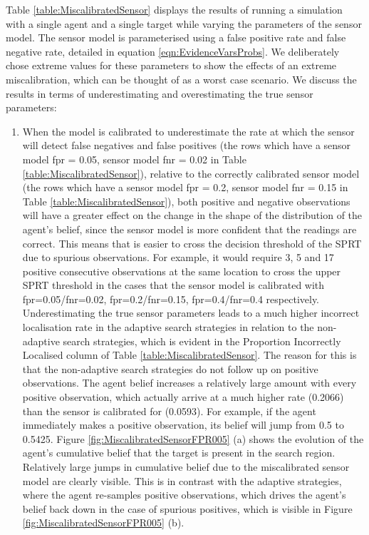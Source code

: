 Table \ref{table:MiscalibratedSensor} displays the results of running a simulation with a single agent and a single target while varying the parameters of the sensor model. The sensor model is parameterised using a false positive rate and false negative rate, detailed in equation \ref{eqn:EvidenceVarsProbs}. We deliberately chose extreme values for these parameters to show the effects of an extreme miscalibration, which can be thought of as a worst case scenario. We discuss the results in terms of underestimating and overestimating the true sensor parameters:
\begin{enumerate}
    \item When the model is calibrated to underestimate the rate at which the sensor will detect false negatives and false positives (the rows which have a sensor model fpr = 0.05, sensor model fnr = 0.02 in Table \ref{table:MiscalibratedSensor}), relative to the correctly calibrated sensor model (the rows which have a sensor model fpr = 0.2, sensor model fnr = 0.15 in Table \ref{table:MiscalibratedSensor}), both positive and negative observations will have a greater effect on the change in the shape of the distribution of the agent's belief, since the sensor model is more confident that the readings are correct. This means that is easier to cross the decision threshold of the SPRT due to spurious observations. For example, it would require 3, 5 and 17 positive consecutive observations at the same location to cross the upper SPRT threshold in the cases that the sensor model is calibrated with fpr=0.05/fnr=0.02, fpr=0.2/fnr=0.15, fpr=0.4/fnr=0.4 respectively.
    Underestimating the true sensor parameters leads to a much higher incorrect localisation rate in the adaptive search strategies in relation to the non-adaptive search strategies, which is evident in the Proportion Incorrectly Localised column of Table \ref{table:MiscalibratedSensor}. The reason for this is that the non-adaptive search strategies do not follow up on positive observations. The agent belief increases a relatively large amount with every positive observation, which actually arrive at a much higher rate (0.2066) than the sensor is calibrated for (0.0593). For example, if the agent immediately makes a positive observation, its belief will jump from 0.5 to 0.5425. Figure \ref{fig:MiscalibratedSensorFPR005} (a) shows the evolution of the agent's cumulative belief that the target is present in the search region. Relatively large jumps in cumulative belief due to the miscalibrated sensor model are clearly visible. This is in contrast with the adaptive strategies, where the agent re-samples positive observations, which drives the agent's belief back down in the case of spurious positives, which is visible in Figure \ref{fig:MiscalibratedSensorFPR005} (b).
    

\end{enumerate}
